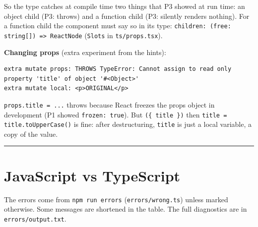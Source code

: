 So the type catches at compile time two things that P3 showed at run time: an object child (P3: throws) and a function child
(P3: silently renders nothing). For a function child the component must say so in its type: \passthrough{\lstinline!children: (free: string[]) => ReactNode!} (\passthrough{\lstinline!Slots!} in \passthrough{\lstinline!ts/props.tsx!}).

\textbf{Changing props} (extra experiment from the hints):

\begin{lstlisting}
extra mutate props: THROWS TypeError: Cannot assign to read only property 'title' of object '#<Object>'
extra mutate local: <p>ORIGINAL</p>
\end{lstlisting}

\passthrough{\lstinline!props.title = ...!} throws because React freezes the props object in development (P1 showed \passthrough{\lstinline!frozen: true!}).
But \passthrough{\lstinline!(\{ title \})!} then \passthrough{\lstinline!title = title.toUpperCase()!} is fine: after destructuring, \passthrough{\lstinline!title!} is just a local variable, a copy of the value.

\begin{center}\rule{0.5\linewidth}{0.5pt}\end{center}

\section{JavaScript vs TypeScript}\label{javascript-vs-typescript}

The errors come from \passthrough{\lstinline!npm run errors!} (\passthrough{\lstinline!errors/wrong.ts!}) unless marked otherwise.
Some messages are shortened in the table. The full diagnostics are in \passthrough{\lstinline!errors/output.txt!}.

